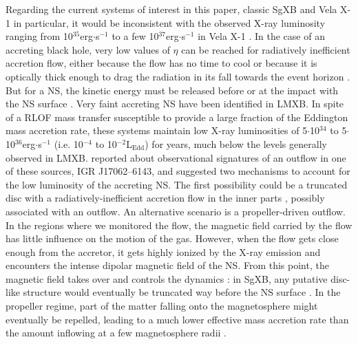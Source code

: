 \documentclass{aa}
\makeatletter
\newcommand{\sgx}{SgXB\xspace}
\newcommand*{\lmxb}{LMXB\@\xspace}
\newcommand*{\rlof}{RLOF\@\xspace}
\newcommand*{\ns}{NS\@\xspace}
\newcommand*{\eg}{e.g.\@\xspace}
\newcommand*{\ie}{i.e.\@\xspace}
\makeatother
\begin{document}
Regarding the current systems of interest in this paper, classic \sgx and Vela X-1 in particular, it would be inconsistent with the observed X-ray luminosity ranging from 10$^{35}$erg$\cdot$s$^{-1}$ to a few 10$^{37}$erg$\cdot$s$^{-1}$ in Vela X-1 \citep{Furst2010}. In the case of an accreting black hole, very low values of $\eta$ can be reached for radiatively inefficient accretion flow, either because the flow has no time to cool or because it is optically thick enough to drag the radiation in its fall towards the event horizon \citep{Narayan1998}. But for a \ns, the kinetic energy must be released before or at the impact with the \ns surface \citep{Medvedev2000}. Very faint accreting \ns have been identified in \lmxb \citep{ArmasPadilla2013}. In spite of a \rlof mass transfer susceptible to provide a large fraction of the Eddington mass accretion rate, these systems maintain low X-ray luminosities of 5$\cdot$10$^{34}$ to 5$\cdot$10$^{36}$erg$\cdot$s$^{-1}$ (\ie 10$^{-4}$ to 10$^{-2}$L$_{\text{Edd}}$) for years, much below the levels generally observed in LMXB. \cite{Degenaar2017} reported about observational signatures of an outflow in one of these sources, IGR J17062–6143, and suggested two mechanisms to account for the low luminosity of the accreting \ns. The first possibility could be a truncated disc with a radiatively-inefficient accretion flow in the inner parts \citep[see \eg the adiabatic inflow-outflow solution derived by][]{Blandford1999}, possibly associated with an outflow. An alternative scenario is a propeller-driven outflow. In the regions where we monitored the flow, the magnetic field carried by the flow has little influence on the motion of the gas. However, when the flow gets close enough from the accretor, it gets highly ionized by the X-ray emission and encounters the intense dipolar magnetic field of the \ns. From this point, the magnetic field takes over and controls the dynamics : in \sgx, any putative disc-like structure would eventually be truncated way before the \ns surface \citep{Ghosh1978}. In the propeller regime, part of the matter falling onto the magnetosphere might eventually be repelled, leading to a much lower effective mass accretion rate than the amount inflowing at a few magnetosphere radii \citep{Illarionov1975,Bozzo2008}.
\end{document}
